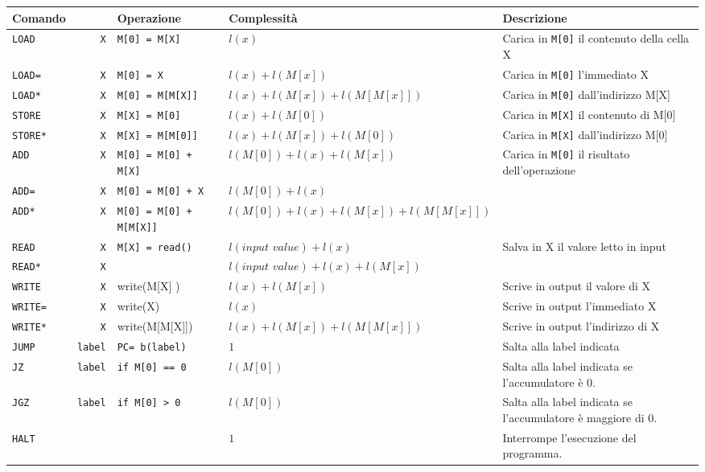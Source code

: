 \documentclass[10pt,a4paper]{article}
\newcommand{\code}{\texttt}
\begin{document}
\hspace*{-0.7cm}
\begin{tabularx}{\linewidth}{l r|l|l|X}
    \hline
    Comando && Operazione & Complessit\`a & Descrizione\\
    \hline
    \code{LOAD} &\code{X}& \code{M[0] = M[X]} & $l(x)$ & Carica in \code{M[0]} il contenuto della cella X\\
    \code{LOAD=} &\code{X}& \code{M[0] = X} & $l(x) + l(M[x])$ & Carica in \code{M[0]} l'immediato X\\
    \code{LOAD*} &\code{X}& \code{M[0] = M[M[X]]} & $l(x) + l(M[x]) + l(M[M[x]])$ & Carica in \code{M[0]} dall'indirizzo M[X]\\
    \code{STORE} &\code{X}& \code{M[X] = M[0]} & $l(x) + l(M[0])$ & Carica in \code{M[X]} il contenuto di M[0]\\
    \code{STORE*} &\code{X}& \code{M[X] = M[M[0]]} & $l(x) + l(M[x]) + l(M[0])$& Carica in \code{M[X]} dall'indirizzo M[0]\\
    \code{ADD} &\code{X}& \code{M[0] = M[0] + M[X]} & $l(M[0]) + l(x) + l(M[x])$ & Carica in \code{M[0]} il risultato dell'operazione\\
    \code{ADD=} &\code{X}& \code{M[0] = M[0] + X} & $l(M[0]) + l(x)$ &\\
    \code{ADD*} &\code{X}& \code{M[0] = M[0] + M[M[X]]} & $l(M[0]) + l(x) + l(M[x]) + l(M[M[x]])$ &\\

    \code{READ} &\code{X}& \code{M[X] = read()} & $l(\textit{input value}) + l(x)$& Salva in X il valore letto in input\\
    \code{READ*} &\code{X}& & $l(\textit{input value}) + l(x) + l(M[x])$ & \\
    \code{WRITE} &\code{X}& write(M[X] ) & $l(x) + l(M[x])$ & Scrive in output il valore di X\\
    \code{WRITE=} &\code{X}& write(X) & $l(x)$ & Scrive in output l'immediato X\\
    \code{WRITE*} &\code{X}& write(M[M[X]]) & $l(x) + l(M[x]) + l(M[M[x]])$ & Scrive in output l'indirizzo di X\\
    \code{JUMP} &\code{label}& \code{PC= b(label)} & $1$ & Salta alla label indicata\\
    \code{JZ} &\code{label}& \code{if M[0] == 0}& $l(M[0])$& Salta alla label indicata se l'accumulatore \`e $0$.\\
    \code{JGZ} &\code{label}& \code{if M[0] > 0}& $l(M[0])$& Salta alla label indicata se l'accumulatore \`e maggiore di $0$.\\
    \code{HALT} && & $1$& Interrompe l'esecuzione del programma.\\
\end{tabularx}
\end{document}
